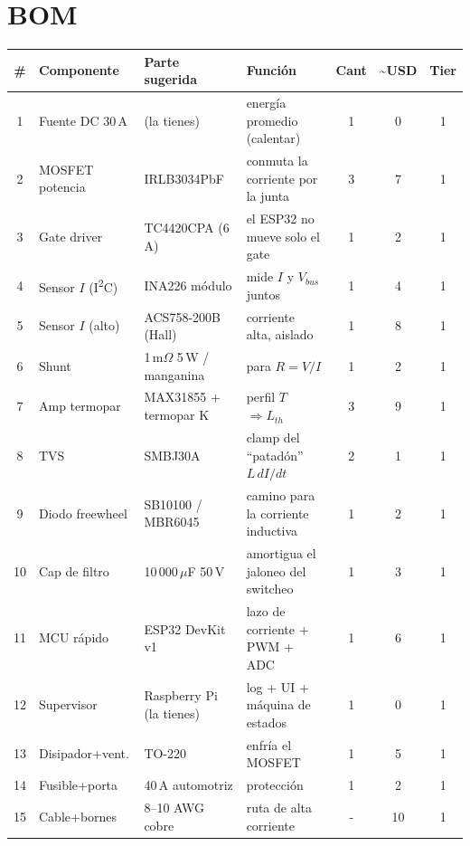 \documentclass[11pt]{article}
\begin{document}
\section*{BOM}
\begin{center}\small
\begin{tabular}{@{}clp{3.0cm}p{4.6cm}ccc@{}}
\toprule
\# & Componente & Parte sugerida & Funci\'on & Cant & \textasciitilde USD & Tier\\
\midrule
1  & Fuente DC 30\,A   & (la tienes)              & energ\'ia promedio (calentar)             & 1 & 0  & 1\\
2  & MOSFET potencia   & IRLB3034PbF              & conmuta la corriente por la junta         & 3 & 7  & 1\\
3  & Gate driver       & TC4420CPA (6\,A)         & el ESP32 no mueve solo el gate            & 1 & 2  & 1\\
4  & Sensor $I$ (I\textsuperscript{2}C) & INA226 m\'odulo & mide $I$ y $V_{bus}$ juntos        & 1 & 4  & 1\\
5  & Sensor $I$ (alto) & ACS758-200B (Hall)       & corriente alta, aislado                   & 1 & 8  & 1\\
6  & Shunt             & 1\,m$\Omega$ 5\,W / manganina & para $R=V/I$                          & 1 & 2  & 1\\
7  & Amp termopar      & MAX31855 + termopar K    & perfil $T$ $\Rightarrow L_{th}$           & 3 & 9  & 1\\
8  & TVS               & SMBJ30A                  & clamp del ``patad\'on'' $L\,dI/dt$        & 2 & 1  & 1\\
9  & Diodo freewheel   & SB10100 / MBR6045        & camino para la corriente inductiva        & 1 & 2  & 1\\
10 & Cap de filtro     & 10\,000\,$\mu$F 50\,V    & amortigua el jaloneo del switcheo         & 1 & 3  & 1\\
11 & MCU r\'apido      & ESP32 DevKit v1          & lazo de corriente + PWM + ADC             & 1 & 6  & 1\\
12 & Supervisor        & Raspberry Pi (la tienes) & log + UI + m\'aquina de estados           & 1 & 0  & 1\\
13 & Disipador+vent.   & TO-220                   & enfr\'ia el MOSFET                         & 1 & 5  & 1\\
14 & Fusible+porta     & 40\,A automotriz         & protecci\'on                              & 1 & 2  & 1\\
15 & Cable+bornes      & 8--10 AWG cobre          & ruta de alta corriente                    & - & 10 & 1\\

\end{tabular}
\end{center}
\end{document}
